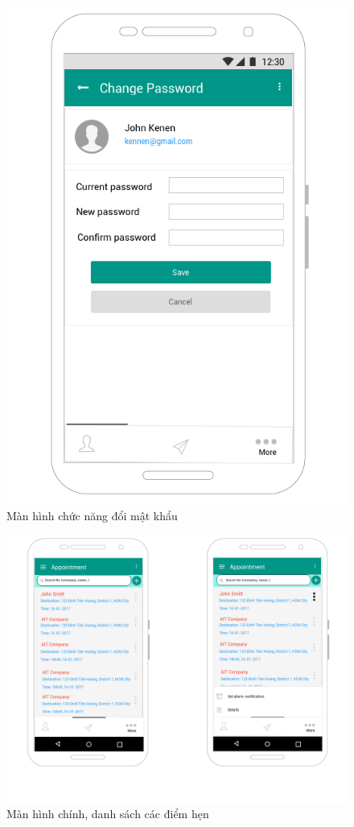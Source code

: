 \documentclass[a4paper]{article}
\begin{document}
\begin{figure}[h]
    \includegraphics[scale=0.6]{Mockup/AC_changepassword}
    \centering
    \caption{Màn hình chức năng đổi mật khẩu}
    \label{fig:AC_changepassword}
\end{figure}
\begin{figure}[h]
    \includegraphics[width=12cm]{Mockup/AP_mainappointment}
    \centering
    \caption{Màn hình chính, danh sách các điểm hẹn}
    \label{fig:AP_mainappointment}
\end{figure}
\end{document}
